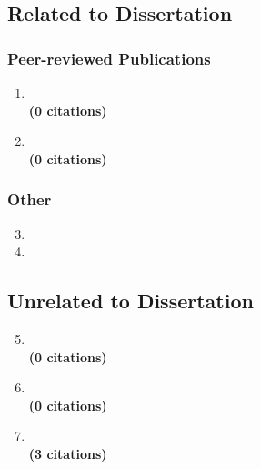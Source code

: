 \documentclass[12pt, a4paper]{book}
\begin{document}
\ListOfPublications{}

\subsection*{Related to Dissertation}
\subsubsection*{Peer-reviewed Publications}

\begin{enumerate}
  \item {} \\
  \textbf{(0 citations)}
  \item {} \\
  \textbf{(0 citations)}
\end{enumerate}

\subsubsection*{Other}
\begin{enumerate}
  \setcounter{enumi}{2}
  \item {}
  \item {}
\end{enumerate}

\subsection*{Unrelated to Dissertation}

\begin{enumerate}
  \setcounter{enumi}{4}
  \item {} \\
  \textbf{(0 citations)}
  \item {} \\
  \textbf{(0 citations)}
  \item {} \\
  \textbf{(3 citations)}
\end{enumerate}
\end{document}
